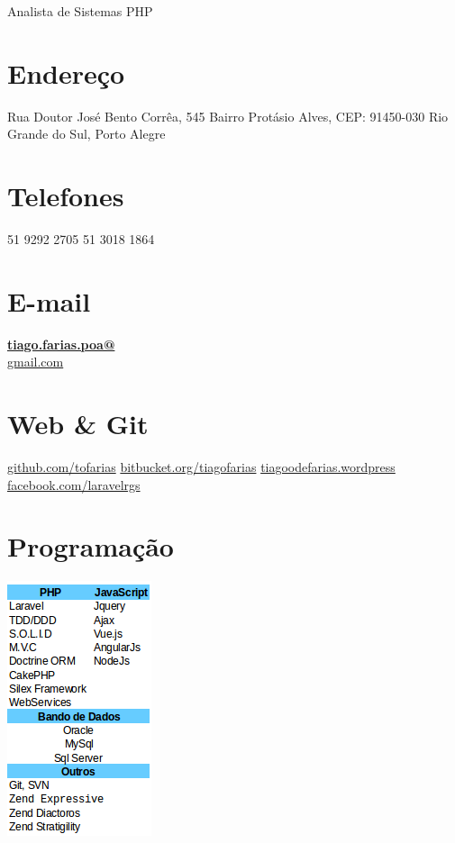 \documentclass[]{friggeri-cv}
\begin{document}
      {Analista de Sistemas PHP}
      

\begin{aside}
  \section{Endereço}  	
    Rua Doutor José Bento Corrêa, 545
    Bairro Protásio Alves,
    CEP: 91450-030
    Rio Grande do Sul, Porto Alegre
    ~
  \section{Telefones}
    51 9292 2705
    51 3018 1864
    ~
  \section{E-mail}
    \href{mailto:tiago.farias.poa@gmail.com}{\textbf{tiago.farias.poa@}\\gmail.com}
    ~
  \section{Web \& Git}
    \href{https://github.com/tofarias}{github.com/tofarias}
    \href{https://bitbucket.org/tiagofarias}{bitbucket.org/tiagofarias}
    \href{https://tiagoodefarias.wordpress.com/}{tiagoodefarias.wordpress}
    \href{https://www.facebook.com/groups/laravelrgs}{facebook.com/laravelrgs}
    ~
  \section{Programação}
    \includegraphics[scale=0.62]{img/techinical-skills.png}
    ~

\end{aside}
\end{document}
